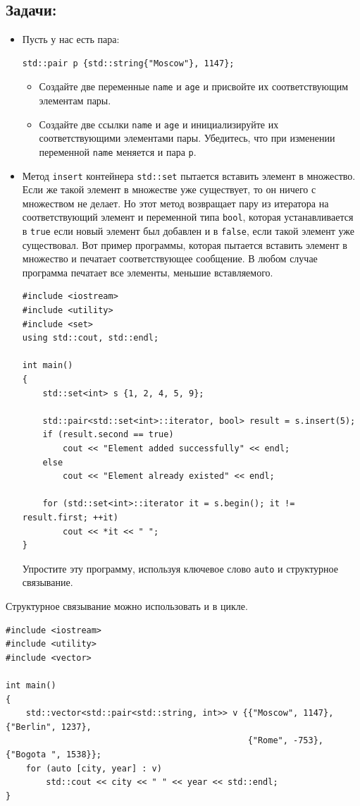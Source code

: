 \documentclass{article}
\begin{document}
\subsection*{Задачи:}
\begin{itemize}
\item Пусть у нас есть пара:
\begin{lstlisting}
std::pair p {std::string{"Moscow"}, 1147};
\end{lstlisting}
\begin{itemize}
\item Создайте две переменные \texttt{name} и \texttt{age} и присвойте их соответствующим элементам пары.
\item Создайте две ссылки \texttt{name} и \texttt{age} и инициализируйте их соответствующими элементами пары. Убедитесь, что при изменении переменной \texttt{name} меняется и пара \texttt{p}.
\end{itemize}

\item Метод \texttt{insert} контейнера \texttt{std::set}  пытается вставить элемент в множество. Если же такой элемент в множестве уже существует, то он ничего с множеством не делает. Но этот метод возвращает пару из итератора на соответствующий элемент и переменной типа \texttt{bool}, которая устанавливается в \texttt{true} если новый элемент был добавлен и в \texttt{false}, если такой элемент уже существовал. Вот пример программы, которая пытается вставить элемент в множество и печатает соответствующее сообщение. В любом случае программа печатает все элементы, меньшие вставляемого.

\begin{lstlisting}
#include <iostream>
#include <utility>
#include <set>
using std::cout, std::endl;

int main() 
{
    std::set<int> s {1, 2, 4, 5, 9};
    
    std::pair<std::set<int>::iterator, bool> result = s.insert(5);
    if (result.second == true)
        cout << "Element added successfully" << endl;
    else
        cout << "Element already existed" << endl;
    
    for (std::set<int>::iterator it = s.begin(); it != result.first; ++it)
        cout << *it << " ";
}
\end{lstlisting}
Упростите эту программу, используя ключевое слово \texttt{auto} и структурное связывание.
\end{itemize}
\newpage
Структурное связывание можно использовать и в цикле.
\begin{lstlisting}
#include <iostream>
#include <utility>
#include <vector>

int main() 
{
    std::vector<std::pair<std::string, int>> v {{"Moscow", 1147}, {"Berlin", 1237}, 
                                                {"Rome", -753},  {"Bogota ", 1538}};
    for (auto [city, year] : v)
        std::cout << city << " " << year << std::endl;
}
\end{lstlisting}
\end{document}
